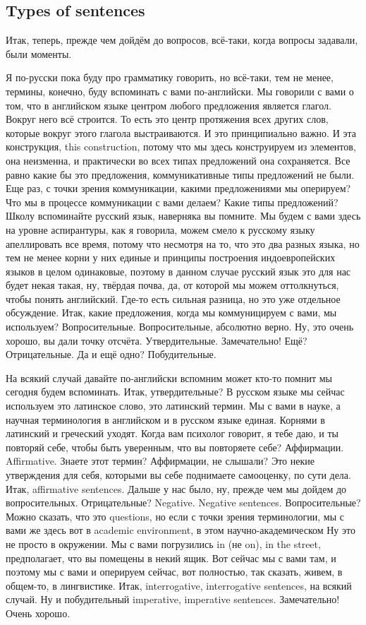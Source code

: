 \documentclass[main.tex]{subfiles}
\begin{document}
\subsection{Types of sentences}

Итак, теперь, прежде чем дойдём до вопросов, всё-таки, когда вопросы задавали, были моменты.

Я по-русски пока буду про грамматику говорить, но всё-таки, тем не менее, термины, конечно, буду вспоминать с вами по-английски.
Мы говорили с вами о том, что в английском языке центром любого предложения является глагол.
Вокруг него всё строится.
То есть это центр протяжения всех других слов, которые вокруг этого глагола выстраиваются.
И это принципиально важно.
И эта конструкция, this construction, потому что мы здесь конструируем из элементов, она неизменна, и практически во всех типах предложений она сохраняется.
Все равно какие бы это предложения, коммуникативные типы предложений не были.
Еще раз, с точки зрения коммуникации, какими предложениями мы оперируем?
Что мы в процессе коммуникации с вами делаем?
Какие типы предложений?
Школу вспоминайте русский язык, наверняка вы помните.
Мы будем с вами здесь на уровне аспирантуры, как я говорила, можем смело к русскому языку апеллировать все время, потому что несмотря на то, что это два разных языка, но тем не менее корни у них единые и принципы построения индоевропейских языков в целом одинаковые, поэтому в данном случае русский язык это для нас будет некая такая, ну, твёрдая почва, да, от которой мы можем оттолкнуться, чтобы понять английский.
Где-то есть сильная разница, но это уже отдельное обсуждение.
Итак, какие предложения, когда мы коммуницируем с вами, мы используем?
Вопросительные.
Вопросительные, абсолютно верно.
Ну, это очень хорошо, вы дали точку отсчёта.
Утвердительные.
Замечательно!
Ещё?
Отрицательные.
Да и ещё одно?
Побудительные.

На всякий случай давайте по-английски вспомним может кто-то помнит мы сегодня будем вспоминать.
Итак, утвердительные?
В русском языке мы сейчас используем это латинское слово, это латинский термин.
Мы с вами в науке, а научная терминология в английском и в русском языке единая.
Корнями в латинский и греческий уходят.
Когда вам психолог говорит, я тебе даю, и ты повторяй себе, чтобы быть уверенным, что вы повторяете себе?
Аффирмации.
Affirmative.
Знаете этот термин? Аффирмации, не слышали?
Это некие утверждения для себя, которыми вы себе поднимаете самооценку, по сути дела.
Итак, affirmative sentences.
Дальше у нас было, ну, прежде чем мы дойдем до вопросительных.
Отрицательные?
Negative.
Negative sentences.
Вопросительные?
Можно сказать, что это questions, но если с точки зрения терминологии, мы с вами же здесь вот в academic environment, в этом научно-академическом
Ну это не просто в окружении.
Мы с вами погрузились in (не on), in the street, предполагает, что вы помещены в некий ящик.
Вот сейчас мы с вами там, и поэтому мы с вами и оперируем сейчас, вот полностью, так сказать, живем, в общем-то, в лингвистике.
Итак, interrogative, interrogative sentences, на всякий случай.
Ну и побудительный imperative, imperative sentences.
Замечательно!
Очень хорошо.
\end{document}

